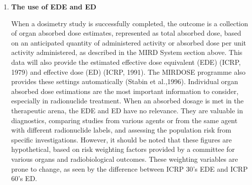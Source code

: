 \documentclass[12pt]{article}
\begin{document}
\begin{enumerate}
\item \textbf{ The use of EDE and ED} \par When a dosimetry study is successfully completed, the outcome is a collection of organ absorbed dose estimates, represented as total absorbed dose, based on an anticipated quantity of administered activity or absorbed dose per unit activity administered, as described in the MIRD System section above. This data will also provide the estimated effective dose equivalent (EDE) (ICRP, 1979) and effective dose (ED) (ICRP, 1991). The MIRDOSE programme also provides these settings automatically (Stabin et al.,1996). Individual organ absorbed dose estimations are the most important information to consider, especially in radionuclide treatment. When an absorbed dosage is met in the therapeutic arena, the EDE and ED have no relevance. They are valuable in diagnostics, comparing studies from various agents or from the same agent with different radionuclide labels, and assessing the population risk from specific investigations. However, it should be noted that these figures are hypothetical, based on risk weighting factors provided by a committee for various organs and radiobiological outcomes. These weighting variables are prone to change, as seen by the difference between ICRP 30's EDE and ICRP 60's ED.
\end{enumerate}
\end{document}
